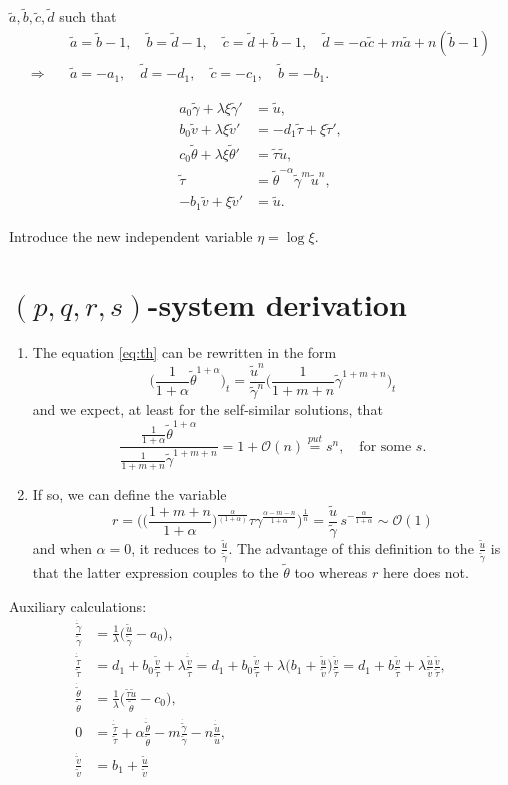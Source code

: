 \documentclass[a4paper,11pt]{article}
\def\tg{{\tilde{\gamma}}}
\def\tv{{\tilde{v}}}
\def\tth{{\tilde{\theta}}}
\def\ts{{\tilde{\tau}}}
\def\tu{{\tilde{u}}}
\def\dtg{\dot{\tilde{\gamma}}}
\def\dtv{\dot{\tilde{v}}}
\def\dtth{\dot{\tilde{\theta}}}
\def\dts{\dot{\tilde{\tau}}}
\def\dtu{\dot{\tilde{u}}}
\def\ta{{\tilde{a}}}
\def\tb{{\tilde{b}}}
\def\tc{{\tilde{c}}}
\def\td{{\tilde{d}}}
\begin{document}
$\ta, \tb, \tc, \td$ such that
\begin{align*}
 &\ta=\tb-1, \quad \tb=\td-1, \quad \tc=\td+\tb-1,\quad \td = -\alpha \tc + m\ta +n(\tb-1) \\
 \Longrightarrow \quad&\ta = -a_1, \quad \td = -d_1, \quad \tc = -c_1, \quad \tb=-b_1.
\end{align*}

\begin{equation}
 \begin{aligned}
  a_0\tg + \lambda\xi\tg' &=\tu,\\
  b_0\tv + \lambda\xi\tv' &=-d_1 \ts + \xi\ts',\\
  c_0\tth+ \lambda\xi\tth'&=\ts\tu,\\
  \ts &=\tth^{-\alpha}\tg^m\tu^n,\\
  -b_1\tv+\xi\tv' &= \tu.
 \end{aligned}
\end{equation}

Introduce the new independent variable $\eta = \log\xi$.
\section{$(p,q,r,s)$-system derivation}

\begin{enumerate}
 \item The equation \eqref{eq:th} can be rewritten in the form
 $$ \Big(\frac{1}{1+\alpha} \tth^{1+\alpha}\Big)_t = \frac{\tu^n}{\tg^n} \Big(\frac{1}{1+m+n} \tg^{1+m+n}\Big)_t$$
 and we expect, at least for the self-similar solutions, that
 $$ \frac{ \frac{1}{1+\alpha} \tth^{1+\alpha} }{ \frac{1}{1+m+n} \tg^{1+m+n} }  = 1 + \mathcal{O}(n) \overset{put}{=} s^n, \quad \text{for some $s$}. $$
 \item If so, we can define the variable 
 $$r = \Big(\Big(\frac{1+m+n}{1+\alpha}\Big)^{\frac{\alpha}{(1+\alpha)}}\tau \gamma^{\frac{\alpha-m-n}{1+\alpha}}\Big)^{\frac{1}{n}} = \frac{\tu}{\tg}\,s^{-\frac{\alpha}{1+\alpha}} \sim \mathcal{O}(1) $$
 and when $\alpha=0$, it reduces to $\frac{\tu}{\tg}$. The advantage of this definition to the $\frac{\tu}{\tg}$ is that the latter expression couples to the $\tth$ too whereas $r$ here does not. 
\end{enumerate}

Auxiliary calculations:
\begin{align*}
 \frac{\dtg}{\tg} &= \frac{1}{\lambda }\Big(\frac{\tu}{\tg}-a_0\Big),\\
 \frac{\dts}{\ts} &= d_1+ b_0\frac{\tv}{\ts} + \lambda \frac{\dtv}{\ts} = d_1+ b_0\frac{\tv}{\ts} + \lambda \Big(b_1 + \frac{\tu}{\tv}\Big)\frac{\tv}{\ts} = d_1 + b\frac{\tv}{\ts} + \lambda\frac{\tu}{\tv}\frac{\tv}{\ts} ,\\
 \frac{\dtth}{\tth}&=\frac{1}{\lambda }\Big(\frac{\ts\tu}{\tth}-c_0\Big),\\
 0&=\frac{\dts}{\ts} +\alpha \frac{\dtth}{\tth} - m \frac{\dtg}{\tg} - n\frac{\dtu}{\tu},\\
 \frac{\dtv}{\tv}&= b_1 +\frac{\tu}{\tv}
\end{align*}
\end{document}
